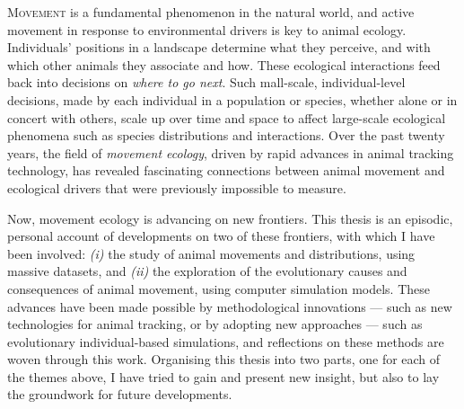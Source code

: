 \label{ch:abstract}


\lettrine{M}{ovement} is a fundamental phenomenon in the natural world, and active movement in response to environmental drivers is key to animal ecology.
Individuals' positions in a landscape determine what they perceive, and with which other animals they associate and how.
These ecological interactions feed back into decisions on \textit{where to go next}.
Such mall-scale, individual-level decisions, made by each individual in a population or species, whether alone or in concert with others, scale up over time and space to affect large-scale ecological phenomena such as species distributions and interactions.
Over the past twenty years, the field of \textit{movement ecology}, driven by rapid advances in animal tracking technology, has revealed fascinating connections between animal movement and ecological drivers that were previously impossible to measure.

Now, movement ecology is advancing on new frontiers.%
This thesis is an episodic, personal account of developments on two of these frontiers, with which I have been involved: \textit{(i)} the study of animal movements and distributions, using massive datasets, and \textit{(ii)} the exploration of the evolutionary causes and consequences of animal movement, using computer simulation models.
These advances have been made possible by methodological innovations --- such as new technologies for animal tracking, or by adopting new approaches --- such as evolutionary individual-based simulations, and reflections on these methods are woven through this work. 
Organising this thesis into two parts, one for each of the themes above, I have tried to gain and present new insight, but also to lay the groundwork for future developments.

